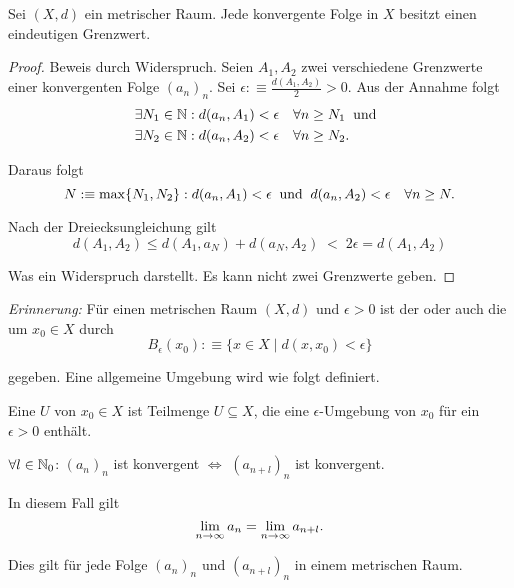 \begin{thm}
	Sei $(X,d)$ ein metrischer Raum. Jede konvergente Folge in $X$ besitzt einen eindeutigen Grenzwert.
\end{thm}
\begin{proof} Beweis durch Widerspruch. Seien $A_1, A_2$ zwei verschiedene Grenzwerte einer konvergenten Folge $(a_n)_n$. Sei $\epsilon :\equiv \frac{d(A_1, A_2)}{2} > 0$. Aus der Annahme folgt
	\begin{equation}
		\begin{aligned}
			\exists N_1 \in \mathbb{N}: d(a_n, A_1) &< \epsilon \quad \forall n \geq N_1 \;\; \text{und}\;\; \\
			\exists N_2 \in \mathbb{N}: d(a_n, A_2) &< \epsilon \quad \forall n \geq N_2.
		\end{aligned}
	\end{equation}

	Daraus folgt
	\begin{equation}
		 N :\equiv \max \{ N_1, N_2 \} : d(a_n, A_1) < \epsilon \;\; \text{und}\;\; d(a_n, A_2) < \epsilon \quad \forall n \geq N.
	\end{equation}

	Nach der Dreiecksungleichung gilt
	\begin{equation}
		d(A_1, A_2) \leq d(A_1, a_N) + d(a_N, A_2) \; \boxed{<} \;  2\epsilon = d(A_1, A_2)
	\end{equation}

	Was ein Widerspruch darstellt. Es kann nicht zwei Grenzwerte geben.
\end{proof}

\emph{Erinnerung:} Für einen metrischen Raum $(X,d)$ und
$\epsilon > 0$ ist der  oder auch die  um $x_0\in X$ durch
\begin{equation}
	B_{\epsilon} (x_0) :\equiv \{ x\in X \mid d(x, x_0) <\epsilon \}
\end{equation}

gegeben. Eine allgemeine Umgebung wird wie folgt definiert.

\setcounter{thm}{23}
\begin{mydef}[Umgebung]
	Eine  $U$ von $x_0 \in X$ ist Teilmenge $U \subseteq X$, die eine $\epsilon$-Umgebung von $x_0$ für ein $\epsilon > 0$ enthält.
\end{mydef}

\begin{thm}[Indexverschiebung]
	$\forall l \in \mathbb{N}_0$: $(a_n)_n$ ist konvergent $\iff$ $(a_{n+l})_n$ ist konvergent.

	In diesem Fall gilt
	\begin{equation}
		\lim_{n \to \infty} a_n = \lim_{n \to \infty} a_{n+l}.
	\end{equation}

	Dies gilt für jede Folge $(a_n)_n$ und $(a_{n+l})_n$ in einem metrischen Raum.
\end{thm}


